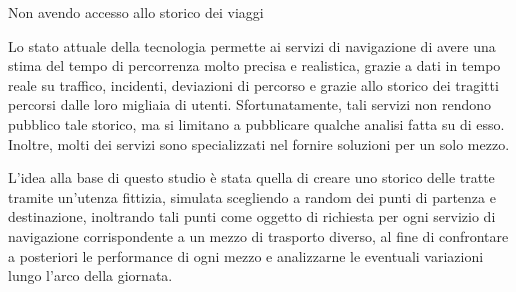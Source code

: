 Non avendo accesso allo storico dei viaggi











Lo stato attuale della tecnologia permette ai servizi di navigazione di avere una stima del tempo di percorrenza molto precisa e realistica, grazie a dati in tempo reale su traffico, incidenti, deviazioni di percorso e grazie allo storico dei tragitti percorsi dalle loro migliaia di utenti. Sfortunatamente, tali servizi non rendono pubblico tale storico, ma si limitano a pubblicare qualche analisi fatta su di esso. Inoltre, molti dei servizi sono specializzati nel fornire soluzioni per un solo mezzo.

\cite{croci2014}

\cite{rotaris2010}

\cite{rotaris2019}

\cite{meinardi2008}


L'idea alla base di questo studio è stata quella di creare uno storico delle tratte tramite un'utenza fittizia, simulata scegliendo a random dei punti di partenza e destinazione, inoltrando tali punti come oggetto di richiesta per ogni servizio di navigazione corrispondente a un mezzo di trasporto diverso, al fine di confrontare a posteriori le performance di ogni mezzo e analizzarne le eventuali variazioni lungo l'arco della giornata.
